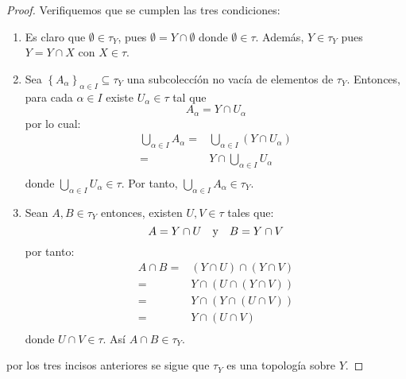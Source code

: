 \documentclass[12pt]{report}
\theoremstyle{largebreak}
\begin{document}
    \begin{proof}
        Verifiquemos que se cumplen las tres condiciones:
        \begin{enumerate}
            \item Es claro que $\emptyset\in\tau_Y$, pues $\emptyset=Y\cap\emptyset$ donde $\emptyset\in\tau$. Además, $Y\in\tau_Y$ pues $Y=Y\cap X$ con $X\in\tau$.
            \item Sea $\left\{A_\alpha \right\}_{\alpha\in I}\subseteq\tau_Y$ una subcoleccíón no vacía de elementos de $\tau_Y$. Entonces, para cada $\alpha\in I$ existe $U_\alpha\in\tau$ tal que
            \begin{equation*}
                A_\alpha=Y\cap U_\alpha
            \end{equation*}
            por lo cual:
            \begin{equation*}
                \begin{split}
                    \bigcup_{\alpha\in I }A_\alpha=&\bigcup_{\alpha\in I }\left(Y\cap U_\alpha \right) \\
                    =&Y\cap \bigcup_{\alpha\in I } U_\alpha\\
                \end{split}
            \end{equation*}
            donde $\bigcup_{\alpha\in I } U_\alpha\in\tau$. Por tanto, $\bigcup_{\alpha\in I }A_\alpha\in\tau_Y$.
            \item Sean $A,B\in\tau_Y$ entonces, existen $U,V\in\tau$ tales que:
            \begin{equation*}
                A=Y\cap U\quad\textup{y}\quad B=Y\cap V
            \end{equation*}
            por tanto:
            \begin{equation*}
                \begin{split}
                    A\cap B=&(Y\cap U)\cap (Y\cap V)\\
                    =&Y\cap (U\cap (Y\cap V))\\
                    =&Y\cap (Y\cap (U\cap V))\\
                    =&Y\cap (U\cap V)\\
                \end{split}
            \end{equation*}
            donde $U\cap V\in\tau$. Así $A\cap B\in\tau_Y$.
        \end{enumerate}
        por los tres incisos anteriores se sigue que $\tau_Y$ es una topología sobre $Y$.
    \end{proof}
    
\end{document}
